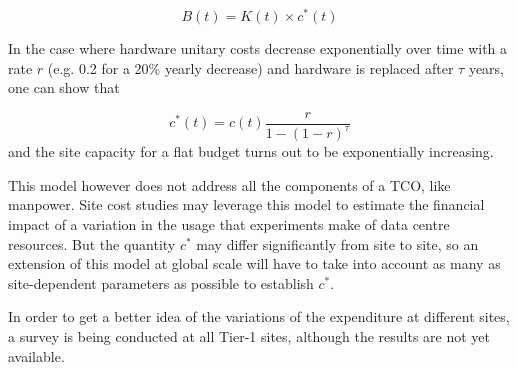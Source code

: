 \begin{equation}
    B (t) = K (t) \times c^* (t)
    \label{eq:costmodel}
\end{equation}

In the case where hardware unitary costs decrease exponentially over
time with a rate $r$ (e.g. 0.2 for a 20\% yearly decrease) and
hardware is replaced after $\tau$ years, one can show that

\begin{equation}
c^*(t)=c(t)\frac{r}{1-(1-r)^\tau}
\end{equation}
and the site capacity for a flat budget turns out to be exponentially
increasing.

This model however does not address all the components of a TCO, like
manpower.  Site cost studies may leverage this model to estimate the
financial impact of a variation in the usage that experiments make of
data centre resources.  But the quantity $c^*$ may differ
significantly from site to site, so an extension of this model at
global scale will have to take into account as many as site-dependent
parameters as possible to establish $c^*$.

In order to get a better idea of the variations of the expenditure at
different sites, a survey is being conducted at all Tier-1 sites,
although the results are not yet available.
